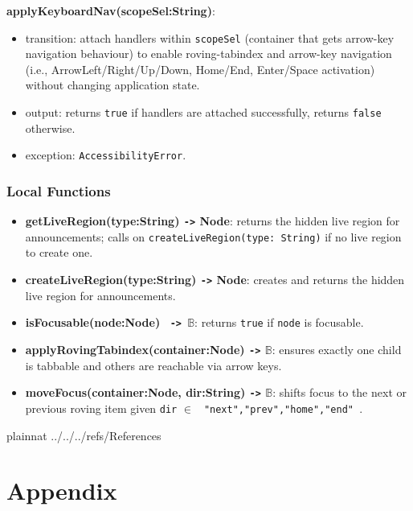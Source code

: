 \documentclass[12pt, titlepage]{article}
\newcommand{\Bool}{\ensuremath{\mathbb{B}}}
\begin{document}
\noindent \textbf{applyKeyboardNav(scopeSel:String)}:
\begin{itemize}
  \item transition: attach handlers within \texttt{scopeSel}
    (container that gets arrow-key navigation behaviour)
    to enable roving-tabindex and arrow-key navigation (i.e.,
    ArrowLeft/Right/Up/Down, Home/End, Enter/Space activation)
    without changing application state.
  \item output: returns \texttt{true} if handlers are attached
    successfully, returns \texttt{false}
    otherwise.
  \item exception: \texttt{AccessibilityError}.
\end{itemize}


\subsubsection{Local Functions}
\begin{itemize}
  \item \textbf{getLiveRegion(type:String)  \texttt{->} Node}:
    returns the hidden live region for announcements;
    calls on \texttt{createLiveRegion(type: String)} if no live
    region to create one.
  \item \textbf{createLiveRegion(type:String) \texttt{->} Node}:
    creates and returns the hidden live region for announcements.
  \item \textbf{isFocusable(node:Node) \texttt{ -> }\Bool}: returns
    \texttt{true} if \texttt{node} is focusable.
  \item \textbf{applyRovingTabindex(container:Node) \texttt{->}
    \Bool}: ensures exactly one child is tabbable
    and others are reachable via arrow keys.
  \item \textbf{moveFocus(container:Node, dir:String) \texttt{->}
    \Bool}: shifts focus to the next or previous roving
    item given \texttt{dir} $\in$ \texttt{{ "next","prev","home","end" }}.
\end{itemize}

\newpage

 {plainnat}
 {../../../refs/References}

\newpage

\section{Appendix} \label{Appendix}


\newpage{}
\end{document}
